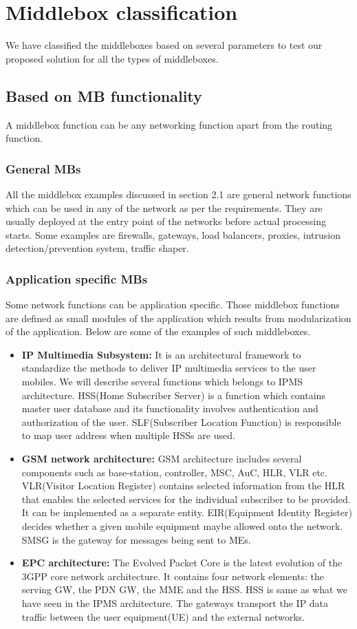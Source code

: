 \documentclass[a4paper,11pt]{report}
\begin{document}
\section{Middlebox classification}
We have classified the middleboxes based on several parameters to test our proposed  solution for all the types of middleboxes.
\subsection{Based on MB functionality}
A middlebox function can be any networking function apart from the routing function.  
\subsubsection{General MBs}
All the middlebox examples discussed in section 2.1 are general network functions which can be used in any of the network as per the requirements. They are usually deployed at the entry point of the networks before actual processing starts. Some examples are firewalls, gateways, load balancers, proxies, intrusion detection/prevention system, traffic shaper.
\subsubsection{Application specific MBs}
Some network functions can be application specific. Those middlebox functions are defined as small modules of the application which results from modularization of the application. Below are some of the examples of such middleboxes.   
\begin{itemize}
\item \textbf{IP Multimedia Subsystem: }It is an architectural framework to standardize the methods to deliver IP multimedia services to the user mobiles. We will describe several functions which belongs to IPMS architecture. HSS(Home Subscriber Server) is a function which contains master user database and its functionality involves authentication and authorization of the user. SLF(Subscriber Location Function) is responsible to map user address when multiple HSSs are used.
\item \textbf{GSM network architecture: }GSM architecture includes several components such as base-station, controller, MSC, AuC, HLR, VLR etc. VLR(Visitor Location Register) contains selected information from the HLR that enables the selected services for the individual subscriber to be provided. It can be implemented as a separate entity. EIR(Equipment Identity Register) decides whether a given mobile equipment maybe allowed onto the network. SMSG is the gateway for messages being sent to MEs.    
\item \textbf{EPC architecture: }The Evolved Packet Core is the latest evolution of the 3GPP core network architecture. It contains four network elements: the serving GW, the PDN GW, the MME and the HSS. HSS is same as what we have seen in the IPMS architecture. The gateways transport the IP data traffic between the user equipment(UE) and the external networks. 	 	 
\end{itemize} 
\end{document}
